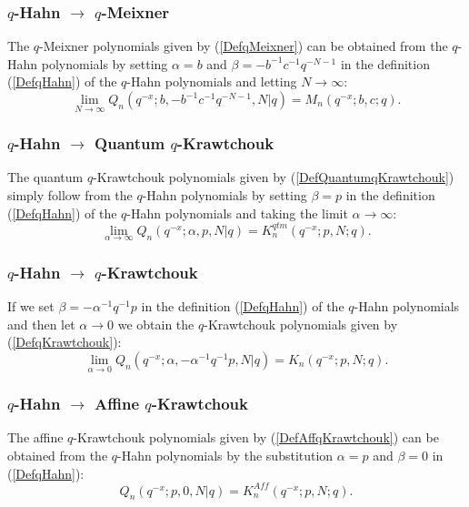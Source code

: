 \documentclass[envcountchap,graybox]{svmono}
\newcounter{rom}
\begin{document}
\subsubsection*{$q$-Hahn $\rightarrow$ $q$-Meixner}
The $q$-Meixner polynomials given by (\ref{DefqMeixner}) can be obtained from the $q$-Hahn polynomials
by setting $\alpha=b$ and $\beta=-b^{-1}c^{-1}q^{-N-1}$ in the definition (\ref{DefqHahn}) of the
$q$-Hahn polynomials and letting $N\rightarrow\infty$:
\begin{equation}
\lim_{N\rightarrow\infty}
Q_n(q^{-x};b,-b^{-1}c^{-1}q^{-N-1},N|q)=M_n(q^{-x};b,c;q).
\end{equation}

\subsubsection*{$q$-Hahn $\rightarrow$ Quantum $q$-Krawtchouk}
The quantum $q$-Krawtchouk polynomials given by (\ref{DefQuantumqKrawtchouk})
simply follow from the $q$-Hahn polynomials by setting $\beta=p$ in the definition (\ref{DefqHahn}) of
the $q$-Hahn polynomials and taking the limit $\alpha\rightarrow\infty$:
\begin{equation}
\lim_{\alpha\rightarrow\infty}Q_n(q^{-x};\alpha,p,N|q)=K_n^{qtm}(q^{-x};p,N;q).
\end{equation}

\subsubsection*{$q$-Hahn $\rightarrow$ $q$-Krawtchouk}
If we set $\beta=-\alpha^{-1}q^{-1}p$ in the definition (\ref{DefqHahn}) of the $q$-Hahn polynomials
and then let $\alpha\rightarrow 0$ we obtain the $q$-Krawtchouk polynomials given by
(\ref{DefqKrawtchouk}):
\begin{equation}
\lim_{\alpha\rightarrow 0}
Q_n(q^{-x};\alpha,-\alpha^{-1}q^{-1}p,N|q)=K_n(q^{-x};p,N;q).
\end{equation}

\subsubsection*{$q$-Hahn $\rightarrow$ Affine $q$-Krawtchouk}
The affine $q$-Krawtchouk polynomials given by (\ref{DefAffqKrawtchouk})
can be obtained from the $q$-Hahn polynomials by the substitution $\alpha=p$ and
$\beta=0$ in (\ref{DefqHahn}):
\begin{equation}
Q_n(q^{-x};p,0,N|q)=K_n^{Aff}(q^{-x};p,N;q).
\end{equation}
\end{document}
